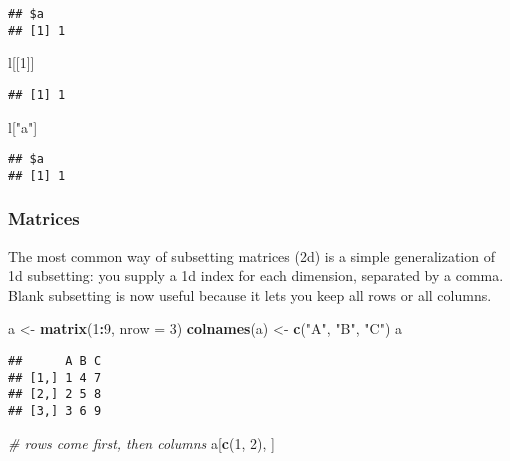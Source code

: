 \documentclass[
]{book}
\newenvironment{Shaded}{\begin{snugshade}}{\end{snugshade}}
\newcommand{\CommentTok}[1]{\textcolor[rgb]{0.56,0.35,0.01}{\textit{#1}}}
\newcommand{\DataTypeTok}[1]{\textcolor[rgb]{0.13,0.29,0.53}{#1}}
\newcommand{\DecValTok}[1]{\textcolor[rgb]{0.00,0.00,0.81}{#1}}
\newcommand{\KeywordTok}[1]{\textcolor[rgb]{0.13,0.29,0.53}{\textbf{#1}}}
\newcommand{\NormalTok}[1]{#1}
\newcommand{\OperatorTok}[1]{\textcolor[rgb]{0.81,0.36,0.00}{\textbf{#1}}}
\newcommand{\StringTok}[1]{\textcolor[rgb]{0.31,0.60,0.02}{#1}}
\begin{document}
\begin{verbatim}
## $a
## [1] 1
\end{verbatim}

\begin{Shaded}
\begin{Highlighting}[]
\NormalTok{l[[}\DecValTok{1}\NormalTok{]]}
\end{Highlighting}
\end{Shaded}

\begin{verbatim}
## [1] 1
\end{verbatim}

\begin{Shaded}
\begin{Highlighting}[]
\NormalTok{l[}\StringTok{"a"}\NormalTok{]}
\end{Highlighting}
\end{Shaded}

\begin{verbatim}
## $a
## [1] 1
\end{verbatim}

\hypertarget{matrices-1}{%
\subsubsection{Matrices}\label{matrices-1}}

The most common way of subsetting matrices (2d) is a simple generalization of 1d subsetting: you supply a 1d index for each dimension, separated by a comma. Blank subsetting is now useful because it lets you keep all rows or all columns.

\begin{Shaded}
\begin{Highlighting}[]
\NormalTok{a \textless{}{-}}\StringTok{ }\KeywordTok{matrix}\NormalTok{(}\DecValTok{1}\OperatorTok{:}\DecValTok{9}\NormalTok{, }\DataTypeTok{nrow =} \DecValTok{3}\NormalTok{)}
\KeywordTok{colnames}\NormalTok{(a) \textless{}{-}}\StringTok{ }\KeywordTok{c}\NormalTok{(}\StringTok{"A"}\NormalTok{, }\StringTok{"B"}\NormalTok{, }\StringTok{"C"}\NormalTok{)}
\NormalTok{a}
\end{Highlighting}
\end{Shaded}

\begin{verbatim}
##      A B C
## [1,] 1 4 7
## [2,] 2 5 8
## [3,] 3 6 9
\end{verbatim}

\begin{Shaded}
\begin{Highlighting}[]
\CommentTok{\# rows come first, then columns}
\NormalTok{a[}\KeywordTok{c}\NormalTok{(}\DecValTok{1}\NormalTok{, }\DecValTok{2}\NormalTok{), ]}
\end{Highlighting}
\end{Shaded}
\end{document}
